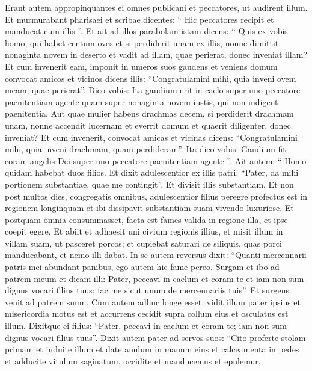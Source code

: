 \begin{biblechapter}
\begin{biblechapter}
\begin{biblechapter}
\begin{biblechapter}
\begin{biblechapter}
\begin{biblechapter}
\begin{biblechapter}
\begin{biblechapter}
\begin{biblechapter}
\begin{biblechapter}
\begin{biblechapter}
\begin{biblechapter}
\begin{biblechapter}
\begin{biblechapter}
\begin{biblechapter}
\verse Erant autem appropinquantes ei omnes publicani et peccatores, ut audirent illum. 
\verse Et murmurabant pharisaei et scribae dicentes: “ Hic peccatores recipit et manducat cum illis ”. 
\verse Et ait ad illos parabolam istam dicens: 
\verse “ Quis ex vobis homo, qui habet centum oves et si perdiderit unam ex illis, nonne dimittit nonaginta novem in deserto et vadit ad illam, quae perierat, donec inveniat illam? 
\verse Et cum invenerit eam, imponit in umeros suos gaudens 
\verse et veniens domum convocat amicos et vicinos dicens illis: “Congratulamini mihi, quia inveni ovem meam, quae perierat”. 
\verse Dico vobis: Ita gaudium erit in caelo super uno peccatore paenitentiam agente quam super nonaginta novem iustis, qui non indigent paenitentia.
 \verse Aut quae mulier habens drachmas decem, si perdiderit drachmam unam, nonne accendit lucernam et everrit domum et quaerit diligenter, donec inveniat? 
\verse Et cum invenerit, convocat amicas et vicinas dicens: “Congratulamini mihi, quia inveni drachmam, quam perdideram”. 
\verse Ita dico vobis: Gaudium fit coram angelis Dei super uno peccatore paenitentiam agente ”.
 \verse Ait autem: “ Homo quidam habebat duos filios. 
\verse Et dixit adulescentior ex illis patri: “Pater, da mihi portionem substantiae, quae me contingit”. Et divisit illis substantiam. 
\verse Et non post multos dies, congregatis omnibus, adulescentior filius peregre profectus est in regionem longinquam et ibi dissipavit substantiam suam vivendo luxuriose. 
\verse Et postquam omnia consummasset, facta est fames valida in regione illa, et ipse coepit egere. 
 \verse Et abiit et adhaesit uni civium regionis illius, et misit illum in villam suam, ut pasceret porcos; 
\verse et cupiebat saturari de siliquis, quas porci manducabant, et nemo illi dabat. 
\verse In se autem reversus dixit: “Quanti mercennarii patris mei abundant panibus, ego autem hic fame pereo. 
\verse Surgam et ibo ad patrem meum et dicam illi: Pater, peccavi in caelum et coram te 
\verse et iam non sum dignus vocari filius tuus; fac me sicut unum de mercennariis tuis”. 
\verse Et surgens venit ad patrem suum.
 Cum autem adhuc longe esset, vidit illum pater ipsius et misericordia motus est et accurrens cecidit supra collum eius et osculatus est illum. 
\verse Dixitque ei filius: “Pater, peccavi in caelum et coram te; iam non sum dignus vocari filius tuus”. 
\verse Dixit autem pater ad servos suos: “Cito proferte stolam primam et induite illum et date anulum in manum eius et calceamenta in pedes 
 \verse et adducite vitulum saginatum, occidite et manducemus et epulemur, 

\end{biblechapter}
\end{biblechapter}
\end{biblechapter}
\end{biblechapter}
\end{biblechapter}
\end{biblechapter}
\end{biblechapter}
\end{biblechapter}
\end{biblechapter}
\end{biblechapter}
\end{biblechapter}
\end{biblechapter}
\end{biblechapter}
\end{biblechapter}
\end{biblechapter}

